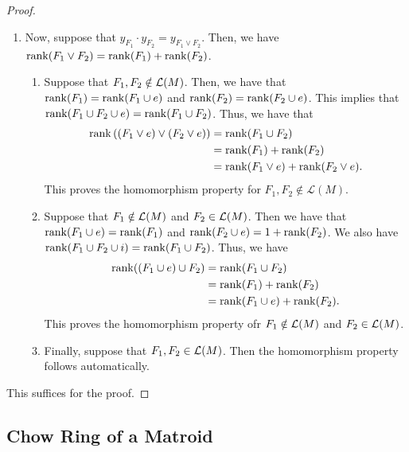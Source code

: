 \documentclass{puthesis-UG}
\begin{document}
\begin{proof}
\begin{enumerate}[label = (\alph*)]
		\item Now, suppose that $y_{F_1} \cdot y_{F_2} = y_{F_1 \vee F_2}$. Then, we have $\operatorname{rank} (F_1 \vee F_2) = \operatorname{rank} (F_1) + \operatorname{rank} (F_2)$. 
		\begin{enumerate}[label = (\roman*)]
			\item Suppose that $F_1, F_2 \notin \mathcal{L}(M)$. Then, we have that $\operatorname{rank} (F_1) = \operatorname{rank}(F_1 \cup e)$ and $\operatorname{rank} (F_2) = \operatorname{rank} (F_2 \cup e)$. This implies that $\operatorname{rank} (F_1 \cup F_2 \cup e) = \operatorname{rank} (F_1 \cup F_2)$. Thus, we have that 
			\begin{align*}
				\operatorname{rank} \left((F_1 \vee e) \vee (F_2 \vee e)\right) & = \operatorname{rank} (F_1 \cup F_2) \\
				& = \operatorname{rank} (F_1) + \operatorname{rank} (F_2) \\
				& = \operatorname{rank} (F_1 \vee e) + \operatorname{rank} (F_2 \vee e). 
			\end{align*}
			This proves the homomorphism property for $F_1, F_2 \notin \mathcal{L}(M)$. 

			\item Suppose that $F_1 \notin \mathcal{L}(M)$ and $F_2 \in \mathcal{L}(M)$. Then we have that $\operatorname{rank} (F_1 \cup e) = \operatorname{rank} (F_1)$ and $\operatorname{rank} (F_2 \cup e) = 1 + \operatorname{rank} (F_2)$. We also have $\operatorname{rank} (F_1 \cup F_2 \cup i) = \operatorname{rank} (F_1 \cup F_2)$. Thus, we have 
			\begin{align*}
				\operatorname{rank}((F_1 \cup e) \cup F_2 ) & = \operatorname{rank} (F_1 \cup F_2) \\
				& = \operatorname{rank} (F_1) + \operatorname{rank} (F_2) \\
				& = \operatorname{rank} (F_1 \cup e) + \operatorname{rank} (F_2). 
			\end{align*}
			This proves the homomorphism property ofr $F_1 \notin \mathcal{L}(M)$ and $F_2 \in \mathcal{L}(M)$. 

			\item Finally, suppose that $F_1, F_2 \in \mathcal{L}(M)$. Then the homomorphism property follows automatically. 
		\end{enumerate}
	\end{enumerate} 
	This suffices for the proof. 
\end{proof}

\subsection{Chow Ring of a Matroid} \label{sec:chow-ring-matroid}
\end{document}
